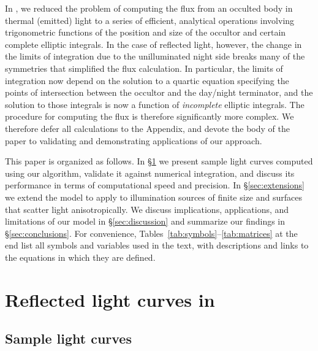\documentclass[modern]{aastex62}
\begin{document}
In \citet{Luger2019}, we reduced the problem of computing the flux from
an occulted body in thermal (emitted) light to a series of efficient, analytical
operations involving trigonometric functions of the position and size of the
occultor and certain complete elliptic integrals. In the case of reflected
light, however, the change in the limits of integration due to the
unilluminated night side breaks many of the symmetries that simplified
the flux calculation. In particular, the limits of integration now depend
on the solution to a quartic equation specifying the points of intersection
between the occultor and the day/night terminator, and the solution to
those integrals is now a function of \emph{incomplete} elliptic integrals.
The procedure for computing the flux is therefore significantly more complex.
%
We therefore defer all calculations to the Appendix, and devote the body of
the paper to validating and demonstrating applications of our approach.

This paper is organized as follows.
In \S\ref{sec:validation} we present sample light curves computed
using our algorithm, validate it against numerical integration, and
discuss its performance in terms of computational speed and precision.
In \S\ref{sec:extensions} we extend the model to apply to illumination
sources of finite size and surfaces that scatter light anisotropically.
We discuss implications, applications, and limitations of our model in
\S\ref{sec:discussion} and summarize our findings in \S\ref{sec:conclusions}.
For convenience, Tables~\ref{tab:symbols}--\ref{tab:matrices} at the end
list all symbols and variables used in the text, with descriptions and
links to the equations in which they are defined.

\section{Reflected light curves in \starry}
\label{sec:validation}

\subsection{Sample light curves}
\label{sec:sample}
\end{document}
